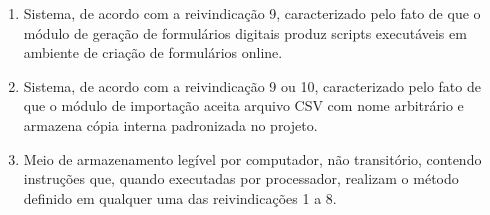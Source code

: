 \begin{enumerate}
  \item Sistema, de acordo com a reivindicação 9, caracterizado pelo fato de que o módulo de geração de formulários digitais produz scripts executáveis em ambiente de criação de formulários online.

  \item Sistema, de acordo com a reivindicação 9 ou 10, caracterizado pelo fato de que o módulo de importação aceita arquivo CSV com nome arbitrário e armazena cópia interna padronizada no projeto.

  \item Meio de armazenamento legível por computador, não transitório, contendo instruções que, quando executadas por processador, realizam o método definido em qualquer uma das reivindicações 1 a 8.
\end{enumerate}

